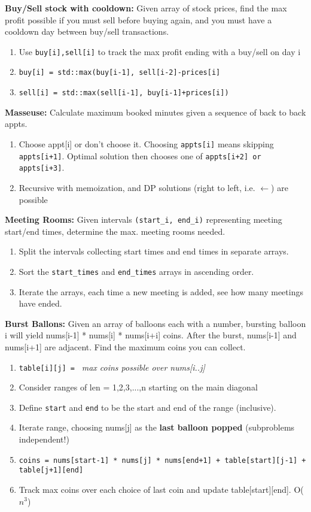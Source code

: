 \documentclass[12pt]{article}
\newcommand{\ONCB}{O($n^3$) }
\begin{document}
\vspace{5mm}
\noindent
\textbf{Buy/Sell stock with cooldown:}
Given array of stock prices, find the max profit possible if you must sell before buying again,
and you must have a cooldown day between buy/sell transactions.
\begin{enumerate}
\item Use \texttt{buy[i],sell[i]} to track the max profit ending with a buy/sell on day i
\item \texttt{buy[i] = std::max(buy[i-1], sell[i-2]-prices[i]}
\item \texttt{sell[i] = std::max(sell[i-1], buy[i-1]+prices[i])}
\end{enumerate}


\vspace{5mm}
\noindent
\textbf{Masseuse:}
Calculate maximum booked minutes given a sequence of back to back appts.
\begin{enumerate}
\item Choose appt[i] or don't choose it. Choosing \texttt{appts[i]} means skipping \texttt{appts[i+1]}. Optimal solution then chooses one of \texttt{appts[i+2] or appts[i+3]}.
\item Recursive with memoization, and DP solutions (right to left, i.e. $\leftarrow$) are possible
\end{enumerate}


\vspace{5mm}
\noindent
\textbf{Meeting Rooms:}
Given intervals \texttt{(start\_i, end\_i)} representing meeting start/end times, determine the max.
meeting rooms needed.
\begin{enumerate}
\item Split the intervals collecting start times and end times in separate arrays.
\item Sort the \texttt{start\_times} and \texttt{end\_times} arrays in ascending order.
\item Iterate the arrays, each time a new meeting is added, see how many meetings have ended.
\end{enumerate}


\vspace{5mm}
\noindent
\textbf{Burst Ballons:}
Given an array of balloons each with a number, bursting balloon i will yield
nums[i-1] * nums[i] * nums[i+i] coins. After the burst, nums[i-1] and nums[i+1] are adjacent.
Find the maximum coins you can collect.
\begin{enumerate}
\item \texttt{table[i][j] = } \emph{max coins possible over nums[i..j]}
\item Consider ranges of len = 1,2,3,...,n starting on the main diagonal
\item Define \texttt{start} and \texttt{end} to be the start and end of the range (inclusive).
\item Iterate range, choosing nums[j] as the \textbf{last balloon popped} (subproblems independent!)
\item \texttt{coins = nums[start-1] * nums[j] * nums[end+1] + table[start][j-1] + table[j+1][end]} 
\item Track max coins over each choice of last coin and update table[start][end]. \ONCB
\end{enumerate}
\end{document}
